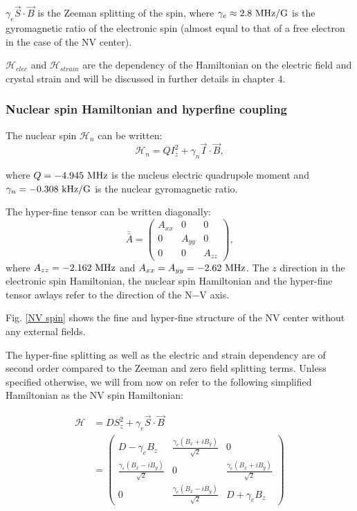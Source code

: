 \documentclass[a4paper, 11pt]{report}
\begin{document}
$\gamma_e \vec{S} \cdot \vec{B}$ is the Zeeman splitting of the spin, where $\gamma_e \approx 2.8\ \rm MHz/G$ is the gyromagnetic ratio of the electronic spin (almost equal to that of a free electron in the case of the NV center).

$\mathcal{H}_{elec}$ and $\mathcal{H}_{strain}$ are the dependency of the Hamiltonian on the electric field and crystal strain and will be discussed in further details in chapter 4.

\subsubsection{Nuclear spin Hamiltonian and hyperfine coupling}
The nuclear spin $\mathcal{H}_n$ can be written:
\begin{equation}
\mathcal{H}_n=Q I_z^2 + \gamma_n \vec{I} \cdot \vec{B},
\end{equation}

where $Q=-4.945\ \rm MHz$ is the nucleus electric quadrupole moment and $\gamma_n=-0.308\ \rm kHz/G$ is the nuclear gyromagnetic ratio.

The hyper-fine tensor can be written diagonally:
\begin{equation}
\bar{\bar{A}} = \begin{pmatrix}
A_{xx} & 0 & 0 \\
0 & A_{yy} & 0 \\
0 & 0 & A_{zz}
\end{pmatrix},
\end{equation}
where $A_{zz}=-2.162\ \rm MHz$ and $A_{xx}=A_{yy}=-2.62\ \rm MHz$. The $z$ direction in the electronic spin Hamiltonian, the nuclear spin Hamiltonian and the hyper-fine tensor awlays refer to the direction of the N$-$V axis.

Fig. \ref{NV spin} shows the fine and hyper-fine structure of the NV center without any external fields.

The hyper-fine splitting as well as the electric and strain dependency are of second order compared to the Zeeman and zero field splitting terms. Unless specified otherwise, we will from now on refer to the following simplified Hamiltonian as the NV spin Hamiltonian:

\begin{align}
\label{NV spin Hamiltonian basic}
\mathcal{H}&=D S_z^2 + \gamma_e \vec{S} \cdot \vec{B} \\
&=\begin{pmatrix}
D-\gamma_e B_z & \frac{\gamma_e (B_x+iB_y)}{\sqrt{2}} & 0 \\
\frac{\gamma_e (B_x-iB_y)}{\sqrt{2}} & 0 & \frac{\gamma_e (B_x+iB_y)}{\sqrt{2}} \\
0 & \frac{\gamma_e (B_x-iB_y)}{\sqrt{2}} & D+\gamma_e B_z
\end{pmatrix} \nonumber
\end{align}
\end{document}
